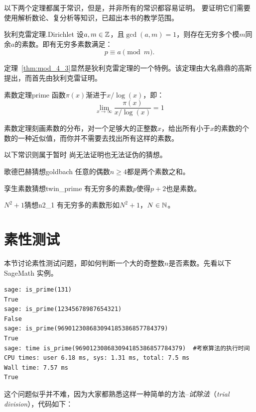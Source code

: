 以下两个定理都属于常识，但是，并非所有的常识都容易证明。
要证明它们需要使用解析数论、复分析等知识，已超出本书的教学范围。
\begin{theorem}{狄利克雷定理.}{Dirichlet}
设$a, m \in {\mathbb Z}$，且$\gcd(a,m)=1$，则存在无穷多个模$m$同余$a$的素数。即有无穷多素数满足：
\[ p \equiv a \pmod{m}.\]
\end{theorem}
定理~\ref{thm:mod_4_3}显然是狄利克雷定理的一个特例。该定理由大名鼎鼎的高斯提出，而首先由狄利克雷证明。

\begin{theorem}{素数定理}{prime}
函数$\pi(x)$渐进于$x/\log(x)$，即：
\[ \lim_{x \to  \infty}\frac{\pi(x)}{x/\log(x)} = 1\]
\end{theorem}
素数定理刻画素数的分布，对一个足够大的正整数$x$，给出所有小于$x$的素数的个数的一种近似值，而你并不需要去找出所有这样的素数。

以下常识则属于暂时
尚无法证明也无法证伪的猜想。
\begin{conjecture}{歌德巴赫猜想}{goldbach}
任意的偶数$n \geq 4$都是两个素数之和。
\end{conjecture}

\begin{conjecture}{孪生素数猜想}{twin_prime}
有无穷多的素数$p$使得$p+2$也是素数。
\end{conjecture}

\begin{conjecture}{$N^2+1$猜想}{n2_1}
有无穷多的素数形如$N^2+1$，$N \in {\mathbb N}$。
\end{conjecture}

\section{素性测试}
\label{sec:primeTest}
本节讨论素性测试问题，即如何判断一个大的奇整数$n$是否素数。先看以下 SageMath 实例。
\begin{example}
\label{exm:prime}
\begin{lstlisting}
sage: is_prime(131)
True
sage: is_prime(12345678987654321)
False
sage: is_prime(969012308683094185386857784379)
True
sage: time is_prime(969012308683094185386857784379)  #考察算法的执行时间
CPU times: user 6.18 ms, sys: 1.31 ms, total: 7.5 ms
Wall time: 7.57 ms
True
\end{lstlisting}
\end{example}

这个问题似乎并不难，因为大家都熟悉这样一种简单的方法--\emph{试除法}（\emph{trial division}），代码如下：
\begin{center}
	
\end{center}

